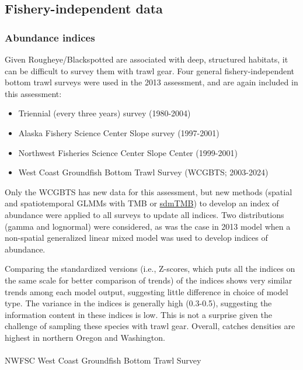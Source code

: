 \documentclass[
]{scrartcl}
\makeatletter
\let\oldparagraph\paragraph
\renewcommand{\paragraph}{
    \@ifstar
      \xxxParagraphStar
      \xxxParagraphNoStar
  }
\newcommand{\xxxParagraphStar}[1]{\oldparagraph*{#1}\mbox{}}
\newcommand{\xxxParagraphNoStar}[1]{\oldparagraph{#1}\mbox{}}
\providecommand{\tightlist}{%
  \setlength{\itemsep}{0pt}\setlength{\parskip}{0pt}}\usepackage{longtable,booktabs,array}
\makeatother
\begin{document}
\subsection{Fishery-independent data}\label{fishery-independent-data}

\subsubsection{Abundance indices}\label{abundance-indices}

Given Rougheye/Blackspotted are associated with deep, structured
habitats, it can be difficult to survey them with trawl gear. Four
general fishery-independent bottom trawl surveys were used in the 2013
assessment, and are again included in this assessment:

\begin{itemize}
\tightlist
\item
  Triennial (every three years) survey (1980-2004)
\item
  Alaska Fishery Science Center Slope survey (1997-2001)
\item
  Northwest Fisheries Science Center Slope Center (1999-2001)
\item
  West Coast Groundfish Bottom Trawl Survey (WCGBTS; 2003-2024)
\end{itemize}

Only the WCGBTS has new data for this assessment, but new methods
(spatial and spatiotemporal GLMMs with TMB or
\href{https://pbs-assess.github.io/sdmTMB/}{sdmTMB}) to develop an index
of abundance were applied to all surveys to update all indices. Two
distributions (gamma and lognormal) were considered, as was the case in
2013 model when a non-spatial generalized linear mixed model was used to
develop indices of abundance.

Comparing the standardized versions (i.e., Z-scores, which puts all the
indices on the same scale for better comparison of trends) of the
indices shows very similar trends among each model output, suggesting
little difference in choice of model type. The variance in the indices
is generally high (0.3-0.5), suggesting the information content in these
indices is low. This is not a surprise given the challenge of sampling
these species with trawl gear. Overall, catches densities are highest in
northern Oregon and Washington.

\paragraph{NWFSC West Coast Groundfish Bottom Trawl
Survey}\label{nwfsc-west-coast-groundfish-bottom-trawl-survey}
\end{document}
